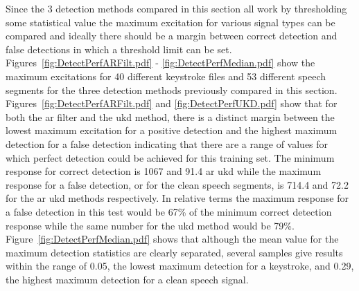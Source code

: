 Since the 3 detection methods compared in this section all work by thresholding some statistical value the maximum excitation for various signal types can be compared and ideally there should be a margin between correct detection and false detections in which a threshold limit can be set. Figures~\ref{fig:DetectPerfARFilt.pdf} - \ref{fig:DetectPerfMedian.pdf} show the maximum excitations for 40 different keystroke files and 53 different speech segments for the three detection methods previously compared in this section. Figures~\ref{fig:DetectPerfARFilt.pdf} and \ref{fig:DetectPerfUKD.pdf} show that for both the \DIFdelbegin {}\DIFdelend \DIFaddbegin \gls{ar} \DIFaddend filter and the \DIFdelbegin {}\DIFdelend \DIFaddbegin \gls{ukd} \DIFaddend method, there is a distinct margin between the lowest maximum excitation for a positive detection and the highest maximum detection for a false detection indicating that there are a range of values for which perfect detection could be achieved for this training set. The minimum response for correct detection is 1067 and 91.4 \DIFaddbegin {}\gls{ar} \gls{ukd} \DIFaddend while the maximum response for a false detection, or for the clean speech segments, is 714.4 and 72.2 for the \DIFdelbegin {}\DIFdelend \DIFaddbegin \gls{ar} \gls{ukd} \DIFaddend methods respectively. In relative terms the maximum response for a false detection in this test would be 67\% of the minimum correct detection response while the same number for the \DIFdelbegin {}\DIFdelend \DIFaddbegin \gls{ukd} \DIFaddend method would be 79\%.
Figure~\ref{fig:DetectPerfMedian.pdf} shows that although the mean value for the maximum detection statistics are clearly separated, several samples give results within the range of 0.05, the lowest maximum detection for a keystroke, and 0.29, the highest maximum detection for a clean speech signal.

